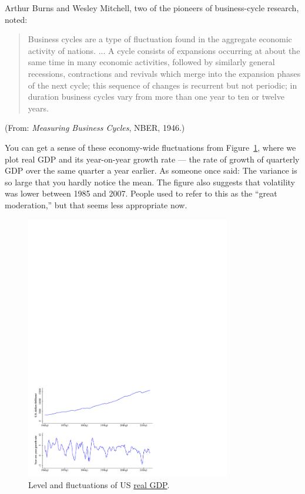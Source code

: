 Arthur Burns and Wesley Mitchell,
two of the pioneers of business-cycle research, noted:
%
\begin{quote}
{Business cycles are a type of
fluctuation found in the aggregate economic activity of
nations. ... A cycle consists of expansions occurring at about the
same time in many economic activities, followed by similarly
general recessions, contractions and revivals which merge into the
expansion phases of the next cycle; this sequence of changes is
recurrent but not periodic; in duration business cycles vary from
more than one year to ten or twelve years.}
\end{quote}
(From: {\it Measuring Business Cycles\/}, NBER, 1946.)

You can get a sense of these economy-wide fluctuations
from Figure~\ref{fig:yandgy},
where we plot real GDP and its year-on-year growth rate --- the rate of growth of quarterly GDP over the same quarter a year earlier.
As someone once said:  The variance is so large that you hardly notice the mean.
The figure also suggests that volatility was lower between 1985
and 2007.
People used to refer to this as the ``great moderation,''
but that seems less appropriate now.

\begin{figure}[h]
 \caption{Level and fluctuations of US \href{http://research.stlouisfed.org/fred2/series/GDPC1?cid=106}{real GDP}.}
    \label{fig:yandgy}
    \centering
    \includegraphics[width=0.8\textwidth]{Figures/us_gdp.pdf}
\end{figure}

